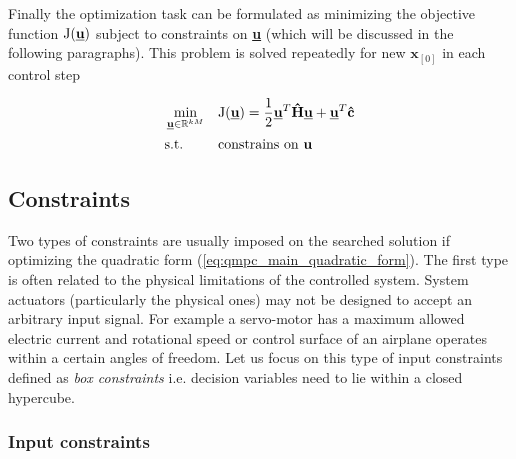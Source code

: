 Finally the optimization task can be formulated as minimizing the objective function $\mathrm{J}(\textbf{\underline{u}})$ subject to constraints on \textbf{\underline{u}} (which will be discussed in the following paragraphs). This problem is solved repeatedly for new $\textbf{x}_{[0]}$ in each control step

\begin{equation}
\label{eq:qmpc_main_quadratic_form}
\begin{aligned}
& \min_{\textbf{\underline{u}} \in \mathbb{R}^{kM}}
& & \mathrm{J}(\underline{\textbf{u}}) = \frac{1}{2}\textbf{\underline{u}}^T\textbf{\^H}\textbf{\underline{u}} + \textbf{\underline{u}}^T\textbf{\^c}\\
& \text{s.t.}
& & \text{constrains on \textbf{u}}
\end{aligned}
\end{equation}


\subsection{Constraints}

Two types of constraints are usually imposed on the searched solution if optimizing the quadratic form (\ref{eq:qmpc_main_quadratic_form}). The first type is often related to the physical limitations of the controlled system. System actuators (particularly the physical ones) may not be designed to accept an arbitrary input signal. For example a servo-motor has a maximum allowed electric current and rotational speed or control surface of an airplane operates within a certain angles of freedom. Let us focus on this type of input constraints defined as \textit{box constraints} i.e. decision variables need to lie within a closed hypercube.

\subsubsection{Input constraints}

